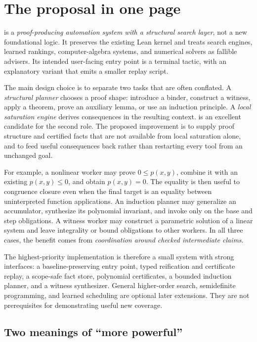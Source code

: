 \section{The proposal in one page}

\forge{} is a \emph{proof-producing automation system with a structural search layer}, not a new foundational logic. It preserves the existing Lean kernel and treats search engines, learned rankings, computer-algebra systems, and numerical solvers as fallible advisers. Its intended user-facing entry point is a terminal tactic, with an explanatory variant that emits a smaller replay script.

The main design choice is to separate two tasks that are often conflated. A \emph{structural planner} chooses a proof shape: introduce a binder, construct a witness, apply a theorem, prove an auxiliary lemma, or use an induction principle. A \emph{local saturation engine} derives consequences in the resulting context. \grind{} is an excellent candidate for the second role. The proposed improvement is to supply proof structure and certified facts that are not available from local saturation alone, and to feed useful consequences back rather than restarting every tool from an unchanged goal.

For example, a nonlinear worker may prove $0\le p(x,y)$, combine it with an existing $p(x,y)\le0$, and obtain $p(x,y)=0$. The equality is then useful to congruence closure even when the final target is an equality between uninterpreted function applications. An induction planner may generalize an accumulator, synthesize its polynomial invariant, and invoke \grind{} only on the base and step obligations. A witness worker may construct a parametric solution of a linear system and leave integrality or bound obligations to other workers. In all three cases, the benefit comes from \emph{coordination around checked intermediate claims}.

The highest-priority implementation is therefore a small system with strong interfaces: a baseline-preserving entry point, typed reification and certificate replay, a scope-safe fact store, polynomial certificates, a bounded induction planner, and a witness synthesizer. General higher-order search, semidefinite programming, and learned scheduling are optional later extensions. They are not prerequisites for demonstrating useful new coverage.

\subsection{Two meanings of ``more powerful''}

